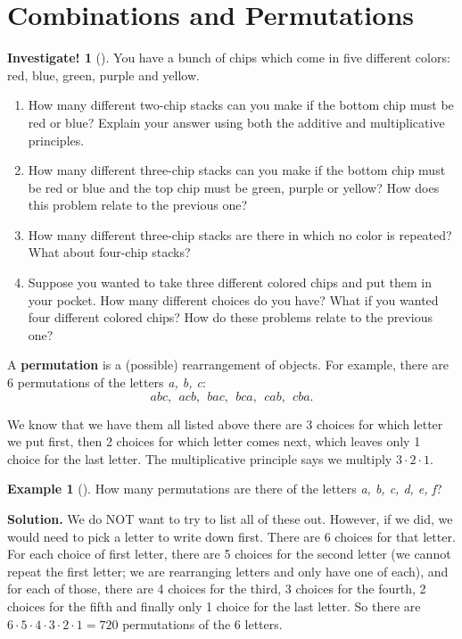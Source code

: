 \documentclass[12pt,]{book}
\newcommand{\terminology}[1]{\textbf{#1}}
\theoremstyle{plain}
\theoremstyle{definition}
\theoremstyle{definition}
\newtheorem{example}[theorem]{Example}
\theoremstyle{definition}
\newtheorem{investigation}[project]{Investigate!}
\numberwithin{equation}{chapter}
\begin{document}
\section[{Combinations and Permutations}]{Combinations and Permutations}\label{sec_counting-combperm}
\begin{investigation}[]\label{investigation-13}
\hypertarget{p-919}{}%
You have a bunch of chips which come in five different colors: red, blue, green, purple and yellow. %
\begin{enumerate}
\item\hypertarget{li-434}{}\hypertarget{p-920}{}%
How many different two-chip stacks can you make if the bottom chip must be red or blue? Explain your answer using both the additive and multiplicative principles.%
\item\hypertarget{li-435}{}\hypertarget{p-921}{}%
How many different three-chip stacks can you make if the bottom chip must be red or blue and the top chip must be green, purple or yellow? How does this problem relate to the previous one?%
\item\hypertarget{li-436}{}\hypertarget{p-922}{}%
How many different three-chip stacks are there in which no color is repeated? What about four-chip stacks?%
\item\hypertarget{li-437}{}\hypertarget{p-923}{}%
Suppose you wanted to take three different colored chips and put them in your pocket. How many different choices do you have? What if you wanted four different colored chips? How do these problems relate to the previous one?%
\end{enumerate}
%
\end{investigation}
\hypertarget{p-924}{}%
A \terminology{permutation} is a (possible) rearrangement of objects. For example, there are 6 permutations of the letters \emph{a, b, c}:%
\begin{equation*}
abc, ~~ acb, ~~ bac, ~~bca, ~~ cab, ~~ cba.
\end{equation*}
%
\par
\hypertarget{p-925}{}%
We know that we have them all listed above \textemdash{}there are 3 choices for which letter we put first, then 2 choices for which letter comes next, which leaves only 1 choice for the last letter. The multiplicative principle says we multiply \(3\cdot 2 \cdot 1\).%
\begin{example}[]\label{example-42}
\hypertarget{p-926}{}%
How many permutations are there of the letters \emph{a, b, c, d, e, f}?%
\par\smallskip%
\noindent\textbf{Solution.}\hypertarget{solution-102}{}\quad%
\hypertarget{p-927}{}%
We do NOT want to try to list all of these out. However, if we did, we would need to pick a letter to write down first. There are 6 choices for that letter. For each choice of first letter, there are 5 choices for the second letter (we cannot repeat the first letter; we are rearranging letters and only have one of each), and for each of those, there are 4 choices for the third, 3 choices for the fourth, 2 choices for the fifth and finally only 1 choice for the last letter. So there are \(6 \cdot 5 \cdot 4 \cdot 3 \cdot 2 \cdot 1 = 720\) permutations of the 6 letters.%
\end{example}
\end{document}
